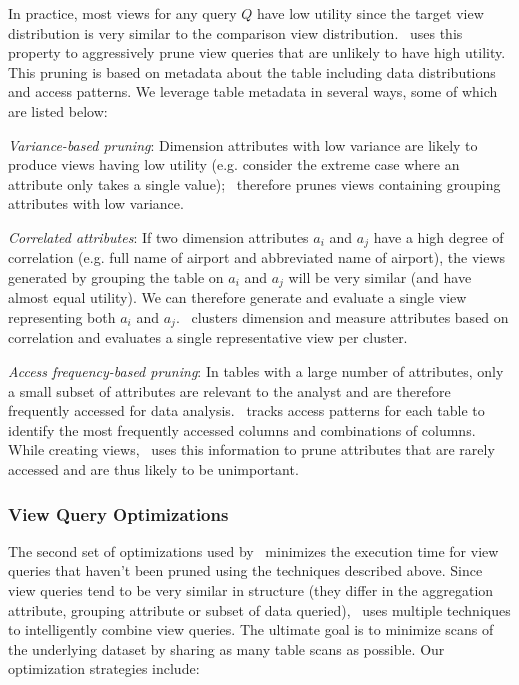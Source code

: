 In practice, most views for any query $Q$ have low utility since the target view
distribution is very similar to the comparison view distribution. 
\SeeDB\ uses this property to aggressively prune 
view queries that are unlikely to have high utility. 
This pruning is based on metadata about the table including data
distributions and access patterns.
We leverage table metadata in several ways, some of which are listed below:
\begin{denselist}
\item {\it Variance-based pruning}: Dimension attributes with low variance are
likely to produce views having low utility (e.g. consider the extreme case where
an attribute only takes a single value); \SeeDB\ therefore prunes views
containing grouping attributes with low variance.
\item {\it Correlated attributes}: If two dimension attributes $a_i$ and $a_j$ have
a high degree of correlation (e.g. full name of airport and abbreviated name of
airport), the views generated by grouping the table on $a_i$ and $a_j$ will be
very similar (and have almost equal utility). We can therefore generate and
evaluate a single view representing both $a_i$ and $a_j$. \SeeDB\ clusters
dimension and measure attributes based on correlation and evaluates a single representative view per
cluster.
\item {\it Access frequency-based pruning}: In tables with a large number of
attributes, only a small subset of attributes are relevant to the analyst and
are therefore frequently accessed for data analysis. \SeeDB\ tracks access patterns
for each table to identify the most frequently accessed columns and combinations of
columns. While creating views, \SeeDB\ uses this information to prune attributes
that are rarely accessed and are thus likely to be unimportant.
\end{denselist}

\subsubsection{View Query Optimizations}
\label{subsubsec:optimizations}

The second set of optimizations used by \SeeDB\ minimizes the execution time for
view queries that haven't been pruned using the techniques described above.
Since view queries tend to be very similar in structure (they differ in the aggregation
attribute, grouping attribute or subset of data queried), \SeeDB\ uses multiple
techniques to intelligently combine view queries.
The ultimate goal is to minimize scans of the underlying dataset by sharing as
many table scans as possible. Our optimization strategies include:


